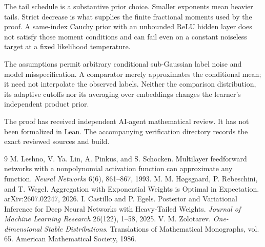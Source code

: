 \documentclass[11pt]{article}
\theoremstyle{remark}\newtheorem{remark}[theorem]{Remark}
\begin{document}
The tail schedule is a substantive prior choice. Smaller exponents mean heavier tails. Strict decrease is what supplies the finite fractional moments used by the proof. A same-index Cauchy prior with an unbounded ReLU hidden layer does not satisfy those moment conditions and can fail even on a constant noiseless target at a fixed likelihood temperature.

The assumptions permit arbitrary conditional sub-Gaussian label noise and model misspecification. A comparator merely approximates the conditional mean; it need not interpolate the observed labels. Neither the comparison distribution, its adaptive cutoffs nor its averaging over embeddings changes the learner's independent product prior.

The proof has received independent AI-agent mathematical review. It has not been formalized in Lean. The accompanying verification directory records the exact reviewed sources and build.
\begin{thebibliography}{9}
 M. Leshno, V. Ya. Lin, A. Pinkus, and S. Schocken. Multilayer feedforward networks with a nonpolynomial activation function can approximate any function. \emph{Neural Networks} 6(6), 861--867, 1993.
 M. M. H\o gsgaard, P. Rebeschini, and T. Wegel. Aggregation with Exponential Weights is Optimal in Expectation. arXiv:2607.02247, 2026.
 I. Castillo and P. Egels. Posterior and Variational Inference for Deep Neural Networks with Heavy-Tailed Weights. \emph{Journal of Machine Learning Research} 26(122), 1--58, 2025.
 V. M. Zolotarev. \emph{One-dimensional Stable Distributions}. Translations of Mathematical Monographs, vol. 65. American Mathematical Society, 1986.
\end{thebibliography}
\end{document}
